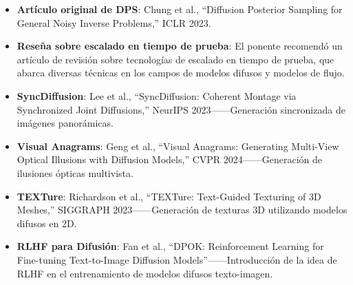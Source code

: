 \documentclass[a4paper]{article}
\begin{document}
\begin{itemize}
    \item \textbf{Artículo original de DPS}: Chung et al., ``Diffusion Posterior Sampling for General Noisy Inverse Problems,'' ICLR 2023.
    \item \textbf{Reseña sobre escalado en tiempo de prueba}: El ponente recomendó un artículo de revisión sobre tecnologías de escalado en tiempo de prueba, que abarca diversas técnicas en los campos de modelos difusos y modelos de flujo.
    \item \textbf{SyncDiffusion}: Lee et al., ``SyncDiffusion: Coherent Montage via Synchronized Joint Diffusions,'' NeurIPS 2023——Generación sincronizada de imágenes panorámicas.
    \item \textbf{Visual Anagrams}: Geng et al., ``Visual Anagrams: Generating Multi-View Optical Illusions with Diffusion Models,'' CVPR 2024——Generación de ilusiones ópticas multivista.
    \item \textbf{TEXTure}: Richardson et al., ``TEXTure: Text-Guided Texturing of 3D Meshes,'' SIGGRAPH 2023——Generación de texturas 3D utilizando modelos difusos en 2D.
    \item \textbf{RLHF para Difusión}: Fan et al., ``DPOK: Reinforcement Learning for Fine-tuning Text-to-Image Diffusion Models''——Introducción de la idea de RLHF en el entrenamiento de modelos difusos texto-imagen.
\end{itemize}

\end{document}
